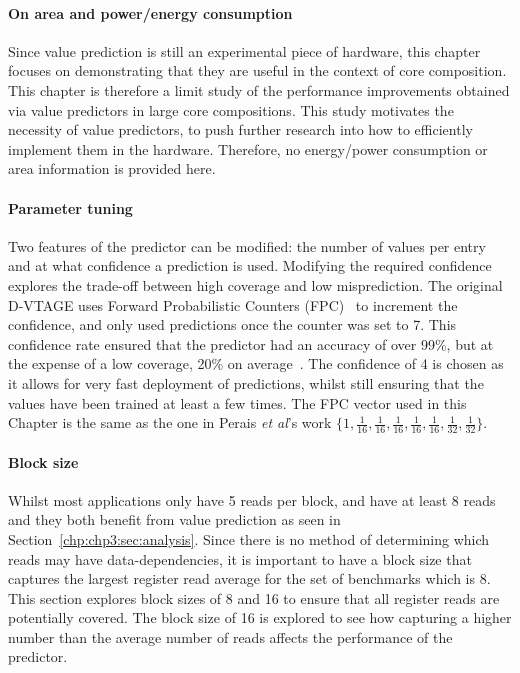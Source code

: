 \paragraph*{On area and power/energy consumption}
Since value prediction is still an experimental piece of hardware, this chapter focuses on demonstrating that they are useful in the context of core composition.
This chapter is therefore a limit study of the performance improvements obtained via value predictors in large core compositions.
This study motivates the necessity of value predictors, to push further research into how to efficiently implement them in the hardware.
Therefore, no energy/power consumption or area information is provided here.

\vspace{-0.5em}
\paragraph*{Parameter tuning}
Two features of the predictor can be modified: the number of values per entry and at what confidence a prediction is used.
Modifying the required confidence explores the trade-off between high coverage and low misprediction.
The original D-VTAGE uses Forward Probabilistic Counters (FPC)~\cite{riley2006fpc} to increment the confidence, and only used predictions once the counter was set to 7.
This confidence rate ensured that the predictor had an accuracy of over 99\%, but at the expense of a low coverage, 20\% on average~\cite{peraisBeBop2015}.
The confidence of 4 is chosen as it allows for very fast deployment of predictions, whilst still ensuring that the values have been trained at least a few times.
The FPC vector used in this Chapter is the same as the one in Perais {\it et al}'s work $\{1,\frac{1}{16},\frac{1}{16},\frac{1}{16},\frac{1}{16},\frac{1}{16},\frac{1}{32},\frac{1}{32}\}$.
\vspace{-0.5em}
\paragraph*{Block size}
Whilst most applications only have 5 reads per block,  and  have at least 8 reads and they both benefit from value prediction as seen in Section~\ref{chp:chp3:sec:analysis}.
Since there is no method of determining which reads may have data-dependencies, it is important to have a block size that captures the largest register read average for the set of benchmarks which is 8.
This section explores block sizes of 8 and 16 to ensure that all register reads are potentially covered. 
The block size of 16 is explored to see how capturing a higher number than the average number of reads affects the performance of the predictor. 

